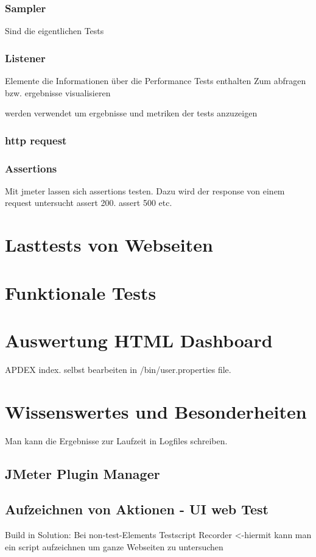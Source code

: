 \documentclass[a4paper,12pt]{article}
\begin{document}
\subsubsection{Sampler}
Sind die eigentlichen Tests
\subsubsection{Listener}
Elemente die Informationen über die Performance Tests enthalten
Zum abfragen bzw. ergebnisse visualisieren

werden verwendet um ergebnisse und metriken der tests anzuzeigen

\subsubsection{http request}
\subsubsection{Assertions}
Mit jmeter lassen sich assertions testen. Dazu wird der response von einem request untersucht assert 200. assert 500 etc.

\section{Lasttests von Webseiten}

\section{Funktionale Tests}

\section{Auswertung HTML Dashboard}
APDEX index. selbst bearbeiten in /bin/user.properties file.

\section{Wissenswertes und Besonderheiten}
Man kann die Ergebnisse zur Laufzeit in Logfiles schreiben.

\subsection{JMeter Plugin Manager}



\subsection{Aufzeichnen von Aktionen - UI web Test}
Build in Solution:
Bei non-test-Elements Testscript Recorder <-hiermit kann man ein script aufzeichnen um ganze Webseiten zu untersuchen
\end{document}
